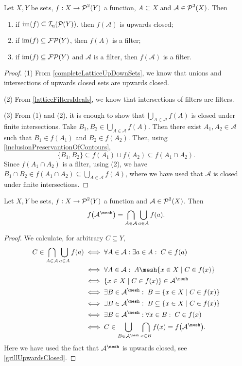 \begin{proposition} \label{contourOfUpsetsAndFilters}
Let $X,Y$ be sets, $f: X\to \operatorname{\mathcal{P}}^2(Y)$ a function, $A\subseteq X$ and $\mathcal{A} \in \operatorname{\mathcal{P}}^2(X)$. Then
\begin{enumerate}
\item if $\operatorname{im}(f) \subseteq \operatorname{\mathcal{I}_u}(\operatorname{\mathcal{P}}(Y))$, then $f(\mathcal{A})$ is upwards closed;
\item if $\operatorname{im}(f) \subseteq \operatorname{\mathcal{FP}}(Y)$, then $f(A)$ is a filter;
\item if $\operatorname{im}(f) \subseteq \operatorname{\mathcal{FP}}(Y)$ and $\mathcal{A}$ is a filter, then $f(\mathcal{A})$ is a filter.
\end{enumerate}
\end{proposition}
\begin{proof}
(1) From \ref{completeLatticeUpDownSets}, we know that unions and intersections of upwards closed sets are upwards closed.

(2) From \ref{latticeFiltersIdeals}, we know that intersections of filters are filters.

(3) From (1) and (2), it is enough to show that $\bigcup_{A\in \mathcal{A}}f(A)$ is closed under finite intersections. Take $B_1,B_2 \in \bigcup_{A\in \mathcal{A}}f(A)$. Then there exist $A_1,A_2 \in \mathcal{A}$ such that $B_1 \in f(A_1)$ and $B_2\in f(A_2)$. Then, using \ref{inclusionPreservantionOfContours},
\[ \{B_1,B_2\} \subseteq f(A_1)\cup f(A_2) \subseteq f(A_1\cap A_2). \]
Since $f(A_1 \cap A_2)$ is a filter, using (2), we have $B_1\cap B_2 \in f(A_1\cap A_2) \subseteq \bigcup_{A\in \mathcal{A}}f(A)$, where we have used that $\mathcal{A}$ is closed under finite intersections.
\end{proof}

\begin{lemma} \label{contourOfGrill}
Let $X, Y$ be sets, $f: X\to \operatorname{\mathcal{P}}^2(Y)$ a function and $\mathcal{A} \in \operatorname{\mathcal{P}}^2(X)$. Then
\[ f\big(\mathcal{A}^\mesh\big) = \bigcap_{A\in \mathcal{A}}\bigcup_{a\in A}f(a). \]
\end{lemma}
\begin{proof}
We calculate, for arbitrary $C\subseteq Y$,
\begin{align*}
C \in \bigcap_{A\in \mathcal{A}}\bigcup_{a\in A}f(a) &\iff \forall A\in \mathcal{A}: \exists a\in A: \; C\in f(a) \\
&\iff \forall A\in \mathcal{A}: \; A \mesh \setbuilder{x\in X}{C\in f(x)} \\
&\iff \setbuilder{x\in X}{C\in f(x)} \in \mathcal{A}^\mesh \\
&\iff \exists B \in \mathcal{A}^\mesh: \; B = \setbuilder{x\in X}{C\in f(x)} \\
&\iff \exists B \in \mathcal{A}^\mesh: \; B \subseteq \setbuilder{x\in X}{C\in f(x)} \\
&\iff \exists B \in \mathcal{A}^\mesh: \forall x\in B: \; C\in f(x) \\
&\iff C \in \bigcup_{B \in \mathcal{A}^\mesh}\bigcap_{x\in B} f(x) = f\big(\mathcal{A}^\mesh\big).
\end{align*}
Here we have used the fact that $\mathcal{A}^\mesh$ is upwards closed, see \ref{grillUpwardsClosed}.
\end{proof}

